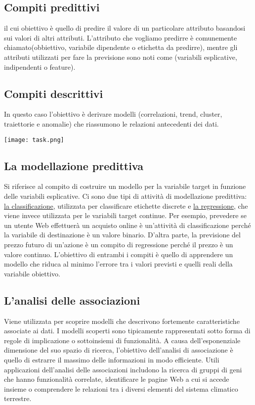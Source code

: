  \subsection{Compiti predittivi}
    il cui obiettivo è quello di predire il valore di un particolare
    attributo basandosi sui valori di altri attributi. L'attributo che vogliamo predirre è comunemente chiamato(obbiettivo, variabile dipendente o etichetta da predirre),
    mentre gli attributi utilizzati per fare la previsione sono noti come (variabili esplicative, indipendenti o feature).

  \clearpage
  
  \subsection{Compiti descrittivi}
    In questo caso l'obiettivo è derivare modelli (correlazioni, trend, cluster, traiettorie e anomalie) che riassumono le
    relazioni antecedenti dei dati.
    
    \texttt{[image: task.png]}


  \subsection{La modellazione predittiva} 
    Si riferisce al compito di costruire un modello per la variabile target
    in funzione delle variabili esplicative. Ci sono due tipi di attività di modellazione predittiva: \underline{la classificazione}, utilizzata per classificare etichette discrete e \underline{la regressione}, che viene invece utilizzata per le variabili target continue. Per
    esempio, prevedere se un utente Web effettuerà un acquisto online è un'attività di classificazione perché la variabile di destinazione è un valore binario.
    D'altra parte, la previsione del prezzo futuro di un'azione è un compito di regressione
    perché il prezzo è un valore continuo. L'obiettivo di entrambi i compiti è quello di
    apprendere un modello che riduca al minimo l'errore tra i valori previsti e quelli reali
    della variabile obiettivo.


  \subsection{L'analisi delle associazioni} 
    Viene utilizzata per scoprire modelli che descrivono fortemente
    caratteristiche associate ai dati. I modelli scoperti sono tipicamente rappresentati
    sotto forma di regole di implicazione o sottoinsiemi di funzionalità. A causa dell'esponenziale
    dimensione del suo spazio di ricerca, l'obiettivo dell'analisi di associazione è quello di estrarre il massimo
    delle informazioni in modo efficiente. Utili applicazioni dell'analisi  delle associazioni
    includono la ricerca di gruppi di geni che hanno funzionalità correlate, identificare le pagine Web a cui si accede insieme o comprendere le relazioni
    tra i diversi elementi del sistema climatico terrestre.

